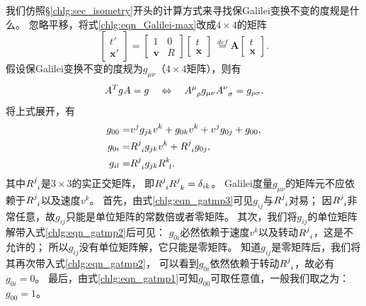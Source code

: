 我们仿照\S\ref{chlg:sec_isometry}开头的计算方式来寻找保Galilei变换不变的度规是什么。
忽略平移，将式\eqref{chlg:eqn_Galilei-max}改成$4\times 4$的矩阵
\begin{equation}
	\begin{bmatrix}  t' \\ \boldsymbol{x}'   \end{bmatrix} =
	\begin{bmatrix}  1 & 0  \\ \boldsymbol{v} & R   \end{bmatrix}
	\begin{bmatrix}  t \\ \boldsymbol{x}  \end{bmatrix} 
	\  \overset{def}{=} \boldsymbol{A} \begin{bmatrix}  t \\ \boldsymbol{x}  \end{bmatrix} .
\end{equation}
假设保Galilei变换不变的度规为$g_{\mu\nu}$（$4\times 4$矩阵），则有
\begin{equation}
	A^T g A = g \quad \Leftrightarrow \quad
	A^{\mu}_{\hphantom{\mu}\rho} g_{\mu\nu} A^{\nu}_{\hphantom{\mu}\sigma} = g_{\rho\sigma}.
\end{equation}
将上式展开，有
\begin{align}
	g_{00} = & v^j g_{jk} v^k + g_{0k} v^k + v^j g_{0j} + g_{00}, \label{chlg:eqn_gatmp1} \\
	g_{0i} = & R^{j}_{\hphantom{j}i} g_{jk} v^k + R^j_{\hphantom{j}i} g_{0j}, \label{chlg:eqn_gatmp2} \\
	g_{il} = & R^j_{\hphantom{j}i} g_{jk} R^k_{\hphantom{j}l} . \label{chlg:eqn_gatmp3}
\end{align}
其中$R^{j}_{\hphantom{j}i}$是$3\times 3$的实正交矩阵，
即$R^{j}_{\hphantom{j}i} R^{j}_{\hphantom{j}k} =\delta_{ik}$。
Galilei度量$g_{\mu\nu}$的矩阵元不应依赖于$R^{j}_{\hphantom{j}i}$以及速度$v^k$。
首先，由式\eqref{chlg:eqn_gatmp3}可见$g_{ij}$与$R^{j}_{\hphantom{j}i}$对易；
因$R^{j}_{\hphantom{j}i}$非常任意，故$g_{ij}$只能是单位矩阵的常数倍或者零矩阵。
其次，我们将$g_{ij}$的单位矩阵解带入式\eqref{chlg:eqn_gatmp2}后可见：
$g_{0i}$必然依赖于速度$v^k$以及转动$R^{j}_{\hphantom{j}i}$，这是不允许的；
所以$g_{ij}$没有单位矩阵解，它只能是零矩阵。
知道$g_{ij}$是零矩阵后，我们将其再次带入式\eqref{chlg:eqn_gatmp2}，
可以看到$g_{0i}$依然依赖于转动$R^{j}_{\hphantom{j}i}$，故必有$g_{0i}=0$。
最后，由式\eqref{chlg:eqn_gatmp1}可知$g_{00}$可取任意值，一般我们取之为：$g_{00}=1$。

